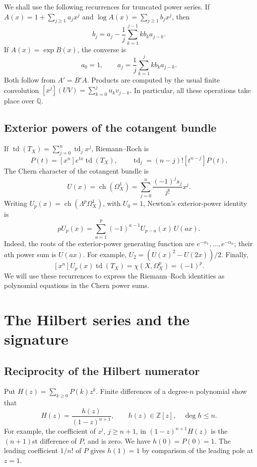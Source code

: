\documentclass[11pt,reqno,letterpaper]{amsart}
\newcommand{\Z}{\mathbb Z}
\newcommand{\Q}{\mathbb Q}
\newcommand{\td}{\operatorname{td}}
\newcommand{\ch}{\operatorname{ch}}
\theoremstyle{definition}
\numberwithin{equation}{section}
\begin{document}
We shall use the following recurrences for truncated power series. If
$A(x)=1+\sum_{j\ge1}a_jx^j$ and $\log A(x)=\sum_{j\ge1}b_jx^j$, then
\begin{equation}\label{eq:logrec}
 b_j=a_j-\frac1j\sum_{k=1}^{j-1}k b_k a_{j-k}.
\end{equation}
If $A(x)=\exp B(x)$, the converse is
\begin{equation}\label{eq:exprec}
 a_0=1,\qquad a_j=\frac1j\sum_{k=1}^j k b_k a_{j-k}.
\end{equation}
Both follow from $A'=B'A$. Products are computed by the usual finite
convolution $[x^j](UV)=\sum_{k=0}^ju_kv_{j-k}$.
In particular, all these operations take place over $\Q$.

\subsection{Exterior powers of the cotangent bundle}
If $\td(T_X)=\sum_{j=0}^n\td_jx^j$, Riemann--Roch is
\begin{equation}\label{eq:recoverTodd}
 P(t)=[x^n]e^{tx}\td(T_X),\qquad
 \td_j=(n-j)![t^{n-j}]P(t).
\end{equation}
The Chern character of the cotangent bundle is
\[
 U(x)=\ch(\Omega_X^1)=\sum_{j=0}^n\frac{(-1)^js_j}{j!}x^j.
\]
Writing $U_p(x)=\ch(\Lambda^p\Omega_X^1)$, with $U_0=1$, Newton's
exterior-power identity is
\begin{equation}\label{eq:exterior}
 p U_p(x)=\sum_{a=1}^p(-1)^{a-1}U_{p-a}(x)\,U(ax).
\end{equation}
Indeed, the roots of the exterior-power generating function are
$e^{-\alpha_1},\ldots,e^{-\alpha_n}$; their $a$th power sum is $U(ax)$.
For example, $U_2=(U(x)^2-U(2x))/2$.
Finally,
\begin{equation}\label{eq:HRRexterior}
 [x^n]U_p(x)\td(T_X)=\chi(X,\Omega_X^p)=(-1)^p.
\end{equation}
We will use these recurrences to express the Riemann--Roch identities
as polynomial equations in the Chern power sums.

\section{The Hilbert series and the signature}\label{sec:hilbert}

\subsection{Reciprocity of the Hilbert numerator}
Put $H(z)=\sum_{k\ge0}P(k)z^k$. Finite differences of a degree-$n$
polynomial show that
\[
 H(z)=\frac{h(z)}{(1-z)^{n+1}},\qquad h(z)\in\Z[z],\quad\deg h\le n.
\]
For example, the coefficient of $z^j$, $j\ge n+1$, in
$(1-z)^{n+1}H(z)$ is the $(n+1)$st difference of $P$, and is zero.
We have $h(0)=P(0)=1$. The leading coefficient $1/n!$ of $P$ gives
$h(1)=1$ by comparison of the leading pole at $z=1$.
\end{document}
